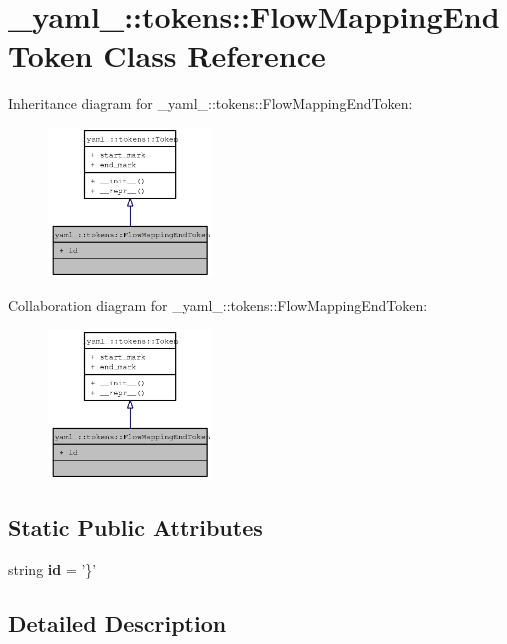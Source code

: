 \section{\_\-yaml\_\-::tokens::FlowMappingEndToken Class Reference}
\label{class__yaml___1_1tokens_1_1FlowMappingEndToken}
Inheritance diagram for \_\-yaml\_\-::tokens::FlowMappingEndToken:\nopagebreak
\begin{figure}[H]
\begin{center}
\leavevmode
\includegraphics[width=123pt]{class__yaml___1_1tokens_1_1FlowMappingEndToken__inherit__graph}
\end{center}
\end{figure}
Collaboration diagram for \_\-yaml\_\-::tokens::FlowMappingEndToken:\nopagebreak
\begin{figure}[H]
\begin{center}
\leavevmode
\includegraphics[width=123pt]{class__yaml___1_1tokens_1_1FlowMappingEndToken__coll__graph}
\end{center}
\end{figure}
\subsection*{Static Public Attributes}
\begin{CompactItemize}
\item 
string {\bf id} = '\}'
\end{CompactItemize}


\subsection{Detailed Description}


